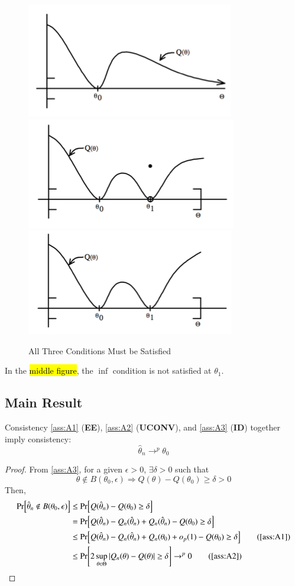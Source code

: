 \documentclass[../main.tex]{subfiles}
\begin{document}
\begin{figure}[htp]
\centering
\caption{All Three Conditions Must be Satisfied}
\label{fig:all3}
\includegraphics[width=.3\textwidth]{wk1/2}\hfill
\includegraphics[width=.3\textwidth]{wk1/3}\hfill
\includegraphics[width=.3\textwidth]{wk1/4}
\end{figure}
In the \hl{middle figure}, the $\inf$ condition is not satisfied at $\theta_1$.

\subsection{Main Result}
\begin{thm}{Consistency}{}\label{thm:consistency}
	\cref{ass:A1} (\textbf{EE}), \cref{ass:A2} (\textbf{UCONV}), and \cref{ass:A3} (\textbf{ID}) together imply consistency:
	$$\hat{\theta}_n \to^p \theta_0$$
\end{thm}

\begin{proof}
From \cref{ass:A3}, for a given $\epsilon > 0$, $\exists \delta > 0$ such that $$\theta \not \in B(\theta_0, \epsilon) \Rightarrow Q(\theta) - Q(\theta_0) \geq \delta > 0$$ 
Then,
\begin{align*}
\Pr[\hat{\theta}_n \not \in B(\theta_0, \epsilon)] 	&\leq \Pr[Q(\hat{\theta}_n) - Q(\theta_0) \geq \delta] \\
													&= \Pr[Q(\hat{\theta}_n) - Q_n(\hat{\theta}_n) + Q_n(\hat{\theta}_n) - Q(\theta_0) \geq \delta] \\
													&\leq \Pr[Q(\hat{\theta}_n) - Q_n(\hat{\theta}_n) + Q_n(\theta_0) + o_p(1) - Q(\theta_0) \geq \delta] \text{\tag{\cref{ass:A1}}} \\
													&\leq \Pr[2 \sup_{\theta \in \Theta} |Q_n(\theta) - Q(\theta)| \geq \delta] \to^p 0 \text{\tag{\cref{ass:A2}}}
\end{align*}
\end{proof}
\end{document}
